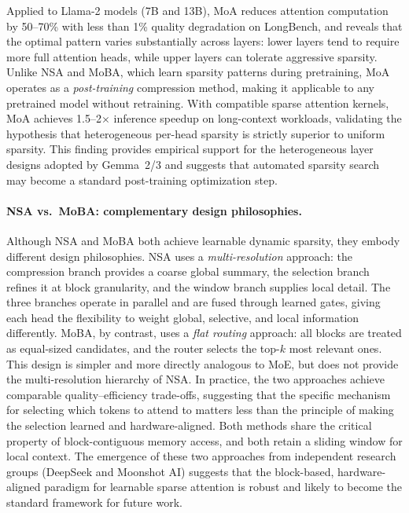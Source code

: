 Applied to Llama-2 models (7B and 13B), MoA reduces attention computation by 50--70\% with less than 1\% quality degradation on LongBench, and reveals that the optimal pattern varies substantially across layers: lower layers tend to require more full attention heads, while upper layers can tolerate aggressive sparsity. Unlike NSA and MoBA, which learn sparsity patterns during pretraining, MoA operates as a \emph{post-training} compression method, making it applicable to any pretrained model without retraining. With compatible sparse attention kernels, MoA achieves 1.5--2$\times$ inference speedup on long-context workloads, validating the hypothesis that heterogeneous per-head sparsity is strictly superior to uniform sparsity. This finding provides empirical support for the heterogeneous layer designs adopted by Gemma~2/3 and suggests that automated sparsity search may become a standard post-training optimization step.

\paragraph{NSA vs.\ MoBA: complementary design philosophies.}
Although NSA and MoBA both achieve learnable dynamic sparsity, they embody different
design philosophies.
NSA uses a \emph{multi-resolution} approach: the compression branch provides a coarse
global summary, the selection branch refines it at block granularity, and the window
branch supplies local detail.
The three branches operate in parallel and are fused through learned gates, giving each
head the flexibility to weight global, selective, and local information differently.
MoBA, by contrast, uses a \emph{flat routing} approach: all blocks are treated as
equal-sized candidates, and the router selects the top-$k$ most relevant ones.
This design is simpler and more directly analogous to MoE, but does not provide the
multi-resolution hierarchy of NSA.
In practice, the two approaches achieve comparable quality--efficiency trade-offs,
suggesting that the specific mechanism for selecting which tokens to attend to matters
less than the principle of making the selection learned and hardware-aligned.
Both methods share the critical property of block-contiguous memory access, and both
retain a sliding window for local context.
The emergence of these two approaches from independent research groups (DeepSeek and
Moonshot AI) suggests that the block-based, hardware-aligned paradigm for learnable
sparse attention is robust and likely to become the standard framework for future work.


